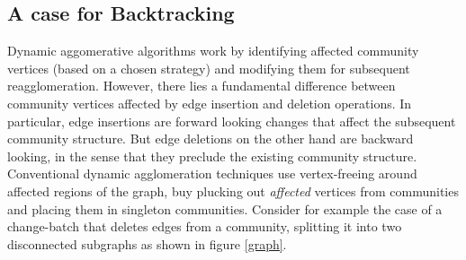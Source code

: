\documentclass[conference]{IEEEtran}
\begin{document}
\subsection{A case for Backtracking}
\label{caseforbt}
Dynamic aggomerative algorithms work by identifying affected community vertices 
(based on a chosen strategy) and modifying them for subsequent 
reagglomeration. However, there lies a fundamental difference between 
community vertices affected by edge insertion and deletion operations. In 
particular, edge insertions are forward looking changes that affect the 
subsequent community structure. But edge deletions on the other hand are 
backward looking, in the sense that they preclude the existing community 
structure. Conventional dynamic agglomeration techniques use vertex-freeing 
around affected regions of the graph, buy plucking out \emph{affected} vertices 
from communities and placing them in singleton communities. Consider for example 
the case of a change-batch that deletes edges from a community, splitting it 
into two disconnected subgraphs as shown in figure \ref{graph}.
\end{document}
